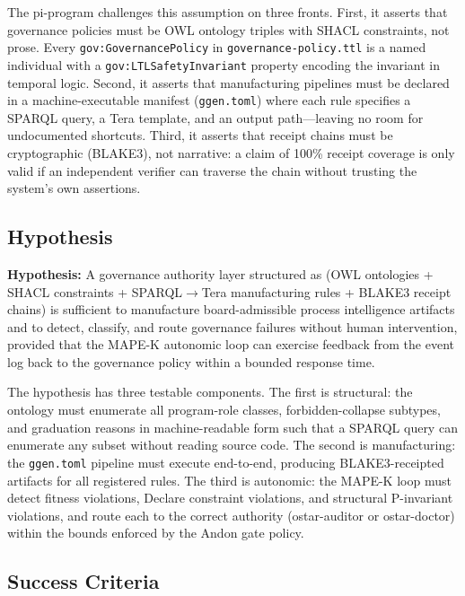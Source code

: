 The pi-program challenges this assumption on three fronts. First, it asserts that governance policies must be OWL ontology triples with SHACL constraints, not prose. Every \texttt{gov:GovernancePolicy} in \texttt{governance-policy.ttl} is a named individual with a \texttt{gov:LTLSafetyInvariant} property encoding the invariant in temporal logic. Second, it asserts that manufacturing pipelines must be declared in a machine-executable manifest (\texttt{ggen.toml}) where each rule specifies a SPARQL query, a Tera template, and an output path---leaving no room for undocumented shortcuts. Third, it asserts that receipt chains must be cryptographic (BLAKE3), not narrative: a claim of 100\% receipt coverage is only valid if an independent verifier can traverse the chain without trusting the system's own assertions.

\subsection{Hypothesis}
\label{sec:research-pi-program-rq-hypothesis}

\textbf{Hypothesis:} A governance authority layer structured as (OWL ontologies + SHACL constraints + SPARQL$\to$Tera manufacturing rules + BLAKE3 receipt chains) is sufficient to manufacture board-admissible process intelligence artifacts and to detect, classify, and route governance failures without human intervention, provided that the MAPE-K autonomic loop can exercise feedback from the event log back to the governance policy within a bounded response time.

The hypothesis has three testable components. The first is structural: the ontology must enumerate all program-role classes, forbidden-collapse subtypes, and graduation reasons in machine-readable form such that a SPARQL query can enumerate any subset without reading source code. The second is manufacturing: the \texttt{ggen.toml} pipeline must execute end-to-end, producing BLAKE3-receipted artifacts for all registered rules. The third is autonomic: the MAPE-K loop must detect fitness violations, Declare constraint violations, and structural P-invariant violations, and route each to the correct authority (ostar-auditor or ostar-doctor) within the bounds enforced by the Andon gate policy.

\subsection{Success Criteria}
\label{sec:research-pi-program-rq-success}

